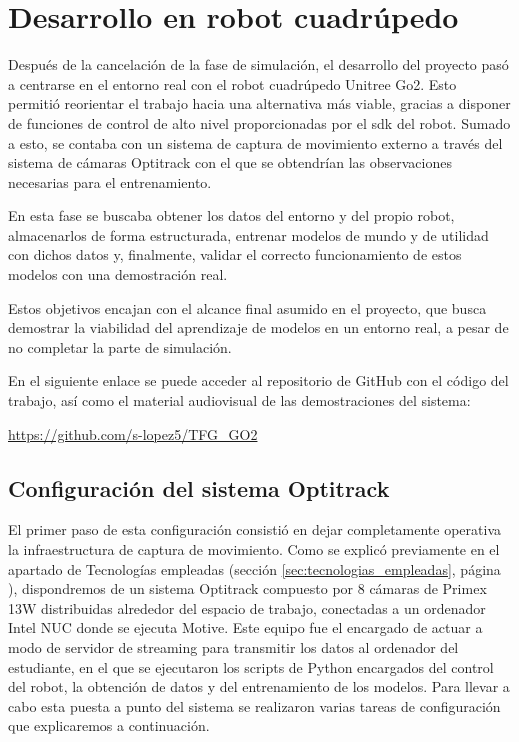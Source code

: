 \section{Desarrollo en robot cuadrúpedo}
\label{sec:desarrollo_robot_cuadrupedo}

Después de la cancelación de la fase de simulación, el desarrollo del proyecto pasó a centrarse en el entorno real con el robot cuadrúpedo Unitree Go2. Esto permitió reorientar el trabajo hacia 
una alternativa más viable, gracias a disponer de funciones de control de alto nivel proporcionadas por el \Gls{sdk} del robot. Sumado a esto, se contaba con un sistema de captura de movimiento 
externo a través del sistema de cámaras Optitrack con el que se obtendrían las observaciones necesarias para el entrenamiento.

En esta fase se buscaba obtener los datos del entorno y del propio robot, almacenarlos de forma estructurada, entrenar modelos de mundo y de utilidad con dichos datos y, finalmente, validar el 
correcto funcionamiento de estos modelos con una demostración real.

Estos objetivos encajan con el alcance final asumido en el proyecto, que busca demostrar la viabilidad del aprendizaje de modelos en un entorno real, a pesar de no completar la parte 
de simulación.

En el siguiente enlace se puede acceder al repositorio de GitHub con el código del trabajo, así como el material audiovisual de las demostraciones del sistema:

\url{https://github.com/s-lopez5/TFG_GO2}

\subsection{Configuración del sistema Optitrack}
\label{sec:desarrollo_conf_optitrack}

El primer paso de esta configuración consistió en dejar completamente operativa la infraestructura de captura de movimiento. Como se explicó previamente en el apartado de Tecnologías 
empleadas (sección \ref{sec:tecnologias_empleadas}, página \pageref{sec:tecnologias_empleadas}), dispondremos de un sistema Optitrack compuesto por 8 cámaras de Primex 13W distribuidas alrededor del espacio de trabajo, conectadas a un ordenador Intel NUC donde se 
ejecuta Motive. Este equipo fue el encargado de actuar a modo de servidor de streaming para transmitir los datos al ordenador del estudiante, en el que se ejecutaron los \gls{script}s de Python 
encargados del control del robot, la obtención de datos y del entrenamiento de los modelos. Para llevar a cabo esta puesta a punto del sistema se realizaron varias tareas de configuración 
que explicaremos a continuación.

